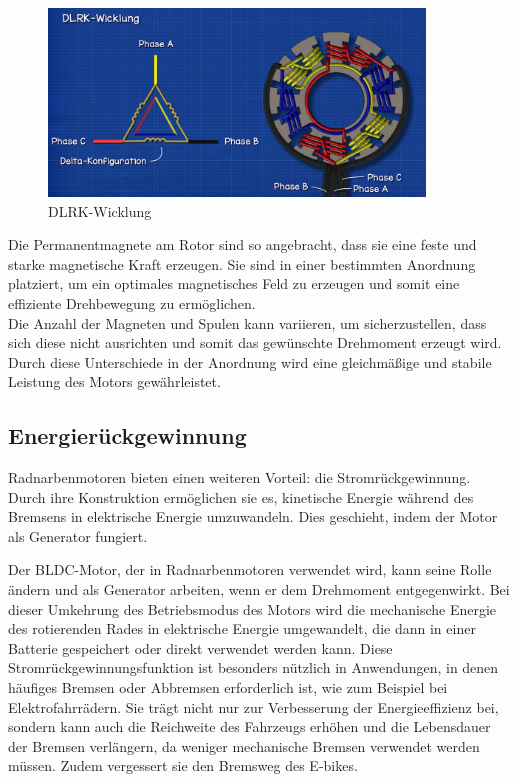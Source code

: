 \begin{figure}[h]
    \centering
    \includegraphics[width=10cm]{images/DLRK-Wicklung.png}
    \caption{DLRK-Wicklung\cite{ingenieursmentalitat_burstenloser_2022}}%
    \label{fig:12}
\end{figure}

Die Permanentmagnete am Rotor sind so angebracht, dass sie eine feste und starke magnetische Kraft erzeugen. Sie sind in einer bestimmten Anordnung platziert, um ein optimales magnetisches Feld zu erzeugen und somit eine effiziente Drehbewegung zu ermöglichen.\\
Die Anzahl der Magneten und Spulen kann variieren, um sicherzustellen, dass sich diese nicht ausrichten und somit das gewünschte Drehmoment erzeugt wird. Durch diese Unterschiede in der Anordnung wird eine gleichmäßige und stabile Leistung des Motors gewährleistet.\\







\subsection{Energierückgewinnung}

Radnarbenmotoren bieten einen weiteren Vorteil: die Stromrückgewinnung. Durch ihre Konstruktion ermöglichen sie es, kinetische Energie während des Bremsens in elektrische Energie umzuwandeln. Dies geschieht, indem der Motor als Generator fungiert.

Der BLDC-Motor, der in Radnarbenmotoren verwendet wird, kann seine Rolle ändern und als Generator arbeiten, wenn er dem Drehmoment entgegenwirkt. Bei dieser Umkehrung des Betriebsmodus des Motors wird die mechanische Energie des rotierenden Rades in elektrische Energie umgewandelt, die dann in einer Batterie gespeichert oder direkt verwendet werden kann. Diese Stromrückgewinnungsfunktion ist besonders nützlich in Anwendungen, in denen häufiges Bremsen oder Abbremsen erforderlich ist, wie zum Beispiel bei Elektrofahrrädern. Sie trägt nicht nur zur Verbesserung der Energieeffizienz bei, sondern kann auch die Reichweite des Fahrzeugs erhöhen und die Lebensdauer der Bremsen verlängern, da weniger mechanische Bremsen verwendet werden müssen. Zudem vergessert sie den Bremsweg des E-bikes.

